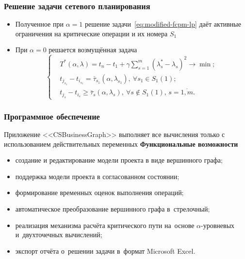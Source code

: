\documentclass[12pt]{beamer}
\begin{document}
\begin{frame}
  \frametitle{Решение задачи сетевого планирования}
  \begin{itemize}
    \item Полученное при $\alpha=1$ решение задачи~\eqref{eq:modified-fcpm-lp} даёт активные ограничения на критические операции и их номера $S_1$
    \item При $\alpha = 0$ решается возмущённая задача
      \begin{equation}
      \label{eq:modified-fcpm-lp-alpha}
        \left \{ \begin{aligned}
          & T^* \left(\alpha, \lambda \right) = t_n-t_1+\gamma \sum \limits_{s=1}^{m} \left(\lambda_s^*-\lambda_s \right)^2 \to \min; \\
          & t_{j_{s_1}}-t_{i_{s_1}} = \bar{\tau}_{s_1}\left(\alpha, \lambda_{s_1} \right),\ \forall s_1 \in S_1\left(1\right); \\
          & t_{j_s}-t_{i_s} \geqslant \bar{\tau}_s\left(\alpha, \lambda_s \right),\ \forall s \notin S_1\left(1\right),\,s=\overline{1,m}.
        \end{aligned} \right.
      \end{equation}
      
  \end{itemize}
\end{frame}

\begin{frame}
  \frametitle{Программное обеспечение}
  Приложение <<CSBusinessGraph>> выполняет все вычисления только с использованием действительных переменных
  \textbf{Функциональные возможности}
  \begin{itemize}
    \item создание и редактирование модели проекта в виде вершинного графа;
    \item поддержка модели проекта в согласованном состоянии;
    \item формирование временных оценок выполнения операций;
    \item автоматическое преобразование вершинного графа в~стрелочный;
    \item реализация механизма расчёта критического пути на~основе $\alpha$-уровневых и~двухточечных вычислений;
    \item экспорт отчёта о~решении задачи в~формат Microsoft Excel.
  \end{itemize}
\end{frame}
\end{document}
